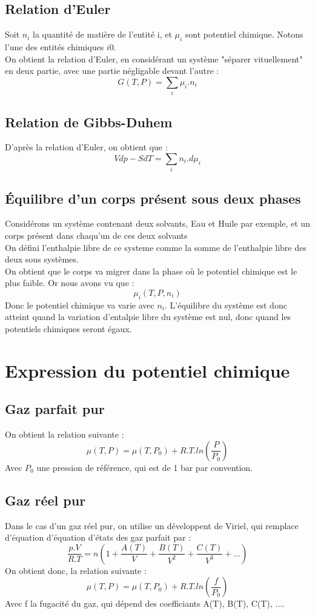 \subsection{Relation d'Euler}
\begin{enon}
Soit $n_i$ la quantité de matière de l'entité i, et $\mu_i$ sont potentiel chimique. Notons l'une des entités chimiques $i0$.\\
On obtient la relation d'Euler, en considérant un système "séparer vituellement" en deux partie, avec une partie négligable devant l'autre :
$$G(T,P) = \sum_i \mu_i.n_{i}$$
\end{enon}
\subsection{Relation de Gibbs-Duhem}
\begin{enon}
D'après la relation d'Euler, on obtient que : 
$$Vdp - SdT = \sum_i n_i.d\mu_i$$
\end{enon}
\subsection{Équilibre d'un corps présent sous deux phases}
Considérons un système contenant deux solvants, Eau et Huile par exemple, et un corps présent dans chaqu'un de ces deux solvants\\
On défini l'enthalpie libre de ce systeme comme la somme de l'enthalpie libre des deux sous systèmes.\\
On obtient que le corps va migrer dans la phase où le potentiel chimique est le plus faible. Or nous avons vu que :
$$\mu_i(T,P,n_i)$$
Donc le potentiel chimique va varie avec $n_i$. L'équilibre du système est donc atteint quand la variation d'entalpie libre du système est nul, donc quand les potentiels chimiques seront égaux.
\section{Expression du potentiel chimique}
\subsection{Gaz parfait pur}
On obtient la relation suivante : 
$$\mu(T,P) = \mu(T,P_0) + R.T.ln\left(\dfrac{P}{P_0}\right)$$
Avec $P_0$ une pression de référence, qui est de 1 bar par convention.
\subsection{Gaz réel pur}
Dans le cas d'un gaz réel pur, on utilise un développent de Viriel, qui remplace d'équation d'équation d'états des gaz parfait par : 
$$\dfrac{p.V}{R.T}= n (1+\dfrac{A(T)}{V}+\dfrac{B(T)}{V^2} +\dfrac{C(T)}{V^3} + \dots)$$
On obtient donc, la relation suivante :
$$\mu(T,P) = \mu(T,P_0) + R.T.ln\left(\dfrac{f}{P_0}\right)$$
Avec f la fugacité du gaz, qui dépend des coefficiants A(T), B(T), C(T), $\dots$.
